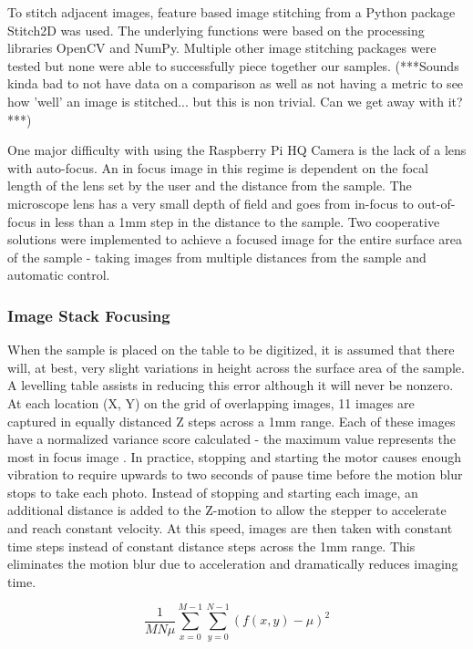 \documentclass[a4paper,12pt]{article}
\begin{document}
To stitch adjacent images, feature based image stitching from a Python package Stitch2D was used. The underlying functions were based on the processing libraries
OpenCV and NumPy. Multiple other image stitching packages were tested but none were able to successfully piece together our samples. (***Sounds kinda bad to not have data on a comparison as well as not having a metric to see how 'well' an image is stitched... but this is non trivial. Can we get away with it?***)

One major difficulty with using the Raspberry Pi HQ Camera is the lack of a lens with auto-focus. An in focus image in this regime is dependent on the focal length of the lens set by the user and the
distance from the sample. The microscope lens has a very small depth of field and goes from in-focus to out-of-focus in less than a 1mm step in the distance to the sample. Two cooperative solutions were implemented 
to achieve a focused image for the entire surface area of the sample - taking images from multiple distances from the sample and automatic control. 

\subsubsection{Image Stack Focusing}
When the sample is placed on the table to be digitized, it is assumed that there will, at best, very slight variations in height across the surface area of the sample. A levelling table 
assists in reducing this error although it will never be nonzero. At each location (X, Y) on the grid of overlapping images, 11 images are captured in equally distanced Z steps across a 1mm range. 
Each of these images have a normalized variance score calculated - the maximum value represents the most in focus image \citep{sampat_extensive_2014}. In practice, stopping and starting the motor causes 
enough vibration to require upwards to two seconds of pause time before the motion blur stops to take each photo. Instead of stopping and starting each image, an additional distance is added to the 
Z-motion to allow the stepper to accelerate and reach constant velocity. At this speed, images are then taken with constant time steps instead of constant distance steps across the 1mm range. This eliminates
the motion blur due to acceleration and dramatically reduces imaging time. 

$$\frac{1}{MN\mu} \sum\limits_{x=0}^{M-1} \sum\limits_{y=0}^{N-1}(f(x,y) - \mu)^2$$
\end{document}

